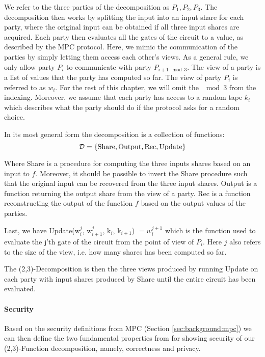 We refer to the three parties of the decomposition as $P_{1}, P_{2}, P_{3}$. The
decomposition then works by splitting the input into an input share for each
party, where the original input can be obtained if all three input shares are
acquired.
Each party then evaluates all the gates of the circuit to a value, as described by
the MPC protocol. Here, we mimic the communication of the parties by simply letting
them access each other's views. As a general rule, we only allow party $P_{i}$ to
communicate with party $P_{i+1 \mod 3}$.
The view of a party is a list of values that the party has computed so far.
The view of party $P_{i}$ is referred to as $w_{i}$.
For the rest of this chapter, we will omit the $\mod 3$ from the
indexing. Moreover, we assume that each party has access to a random tape $k_{i}$
which describes what the party should do if the protocol asks for a random
choice.

\begin{definition}
  In its most general form the decomposition is a collection of functions:
  \[
    \mathcal{D} = \{\text{Share}, \text{Output}, \text{Rec}, \text{Update}\}
  \]

  Where Share is a procedure for computing the three inputs shares based on an
  input to $f$.
  Moreover, it should be possible to invert the Share procedure such that the
  original input can be recovered from the three input shares.
  Output is a function returning the output share from the view of a party.
  Rec is a function reconstructing the output of the function $f$ based on the
  output values of the parties.

  Last, we have Update(w$^{j}_{i}$, w$^{j}_{i+1}$, k$_{i}$, k$_{i+1}$) $= w^{j+1}_{i}$ which
  is the function used to evaluate the j'th gate of the circuit from the point
  of view of $P_{i}$. Here
  $j$ also refers to the size of the view, i.e. how many shares has been
  computed so far.
\end{definition}

The (2,3)-Decomposition is then the three views produced by running Update on
each party with input shares produced by Share until the entire circuit has been
evaluated.

\paragraph{Security}
Based on the security definitions from MPC (Section \ref{sec:background:mpc}) we
can then define the two fundamental properties from \cite{zkboo} for showing security of
our (2,3)-Function decomposition, namely, correctness and privacy.

